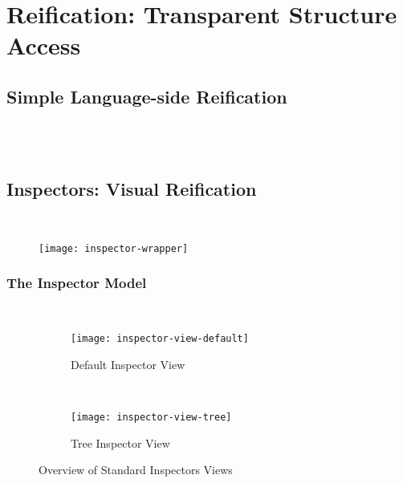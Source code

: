 
\chapter{Reification: Transparent Structure Access}
\minitoc
\introduction



\newpage
\section{Simple Language-side Reification}
 \\
 \\


\section{Inspectors: Visual Reification}
 \\


\begin{figure}[h]
	\centering
	\texttt{[image: inspector-wrapper]}
	\caption{}
\end{figure}

\subsection{The Inspector Model}
 \\



\begin{figure}[h]
	\centering
	\begin{subfigure}[t]{\textwidth}
		\centering
		\texttt{[image: inspector-view-default]}
		\caption{Default Inspector View}
	\end{subfigure} \\
	\vspace{\baselineskip}
	\begin{subfigure}[t]{\textwidth}
		\centering
		\texttt{[image: inspector-view-tree]}
		\caption{Tree Inspector View}
	\end{subfigure} 

	\caption{Overview of Standard Inspectors Views}
\end{figure}

